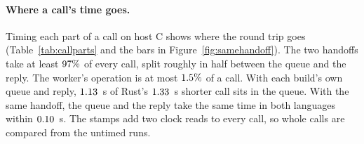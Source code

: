 \documentclass[english,oneside,a4paper,censored,csm,software-track-2020]{HYthesisML}
\begin{document}
\paragraph{Where a call's time goes.}
Timing each part of a call on host C shows where the round trip goes
(Table~\ref{tab:callparts} and the bars in Figure~\ref{fig:samehandoff}). The two handoffs take at least
$97\%$ of every call, split roughly in half between the
queue and the reply. The worker's operation is at most
$1.5\%$ of a call. With each build's own queue and reply,
$1.13$~\textmu s of Rust's $1.33$~\textmu s shorter
call sits in the queue. With the same handoff, the queue and the reply take
the same time in both languages within $0.10$~\textmu s. The
stamps add two clock reads to every call, so whole calls are compared from
the untimed runs.
\end{document}
